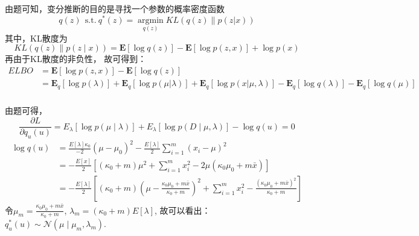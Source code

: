 \documentclass[UTF8,a4paper,AutoFakeBold,AutoFakeSlant]{article}
\begin{document}
\subsubsection{}

由题可知，变分推断的目的是寻找一个参数的概率密度函数
\begin{equation*}
  q(z)~~\text{s.t.}~ q^*(z) = \mathop{\arg\min}\limits_{q(z)} KL\left(q(z)\| p(z|x)\right)
\end{equation*}
其中，KL散度为
$$ KL(q(z) \| p(z \mid x))=\mathbf{E} [\log q(z)]-\mathbf{E} [\log p(z, x)]+\log p(x) $$
再由于KL散度的非负性，
故可得到：
\begin{equation*}
  \begin{aligned}
    ELBO & = \mathbf{E} [\log p(z,x)]-\mathbf{E} [\log q(z)]                                                                                                                       \\
         & =\mathbf{E}_q [\log p(\lambda)] + \mathbf{E}_q [\log p(\mu|\lambda)] + \mathbf{E}_q[\log p(x|\mu,\lambda)] - \mathbf{E}_q[\log q(\lambda)] - \mathbf{E}_q [\log q(\mu)]
  \end{aligned}
\end{equation*}


\subsubsection{}

由题可得，
$$ \frac{\partial L}{\partial q_u(u)}=E_{\lambda}[\log p(\mu \mid \lambda)]+E_{\lambda}[\log p(D \mid \mu, \lambda)]-\log q(u)=0 $$
\begin{equation*}
  \begin{aligned}
    \log q(u) & =\frac{E[\lambda] \kappa_{0}}{-2}\left(\mu-\mu_{0}\right)^{2}-\frac{E[\lambda]}{2} \sum_{i=1}^{m}\left(x_{i}-\mu\right)^{2}                                                                                                    \\
              & =-\frac{E[x]}{2}\left[\left(\kappa_{0}+m\right) \mu^{2}+\sum_{i=1}^{m} x_{i}^{2}-2 \mu\left(\kappa_{0} \mu_{0}+m \bar{x}\right)\right]                                                                                         \\
              & =-\frac{E[\lambda]}{2}\left[\left(\kappa_{0}+m\right)\left(\mu-\frac{\kappa_{0} \mu_{0}+m \bar{x}}{\kappa_{0}+m}\right)^{2}+\sum_{i=1}^{m} x_{i}^{2}-\frac{\left(\kappa_{0} \mu_{0}+m \bar{x}\right)^{2}}{\kappa_{0}+m}\right]
  \end{aligned}
\end{equation*}
令$ \mu_m = \frac{\kappa_{0} \mu_{0}+m \bar{x}}{\kappa_{0}+m} $, $ \lambda_m = (\kappa_0+m)E[\lambda] $,
故可以看出：$ q_u^*(u) \sim \mathcal{N} (\mu \mid \mu_m, \lambda_m) $.
\end{document}
